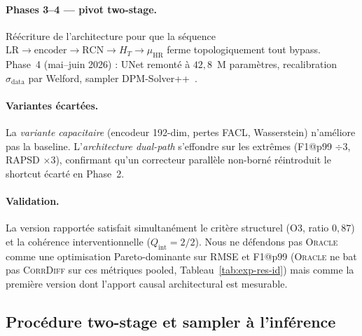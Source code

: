 \documentclass[14pt,a4paper,openany]{extreport}
\newcommand{\Oracle}{\textsc{Oracle}}
\newcommand{\CorrDiff}{\textsc{CorrDiff}}
\newcommand{\HR}{\ensuremath{\text{HR}}}
\newcommand{\LR}{\ensuremath{\text{LR}}}
\newcommand{\muHR}{\ensuremath{\mu_{\HR}}}
\newcommand{\HT}{\ensuremath{H_T}}
\begin{document}
\paragraph{Phases 3--4 --- pivot two-stage.} Réécriture de l'architecture pour que la séquence $\LR \to \mathrm{encoder} \to \mathrm{RCN} \to \HT \to \muHR$ ferme topologiquement tout bypass. Phase~4 (mai--juin 2026) : UNet remonté à $42{,}8$~M paramètres, recalibration $\sigma_{\mathrm{data}}$ par Welford, sampler DPM-Solver++~\cite{lu_dpmpp_2022}.

\paragraph{Variantes écartées.} La \emph{variante capacitaire} (encodeur 192-dim, pertes FACL, Wasserstein) n'améliore pas la baseline. L'\emph{architecture dual-path} s'effondre sur les extrêmes (F1@p99 $\div 3$, RAPSD $\times 3$), confirmant qu'un correcteur parallèle non-borné réintroduit le shortcut écarté en Phase~2.

\paragraph{Validation.} La version rapportée satisfait simultanément le critère structurel (O3, ratio $0{,}87$) et la cohérence interventionnelle ($Q_{\mathrm{int}}=2/2$). Nous ne défendons pas \Oracle{} comme une optimisation Pareto-dominante sur RMSE et F1@p99 (\Oracle{} ne bat pas \CorrDiff{} sur ces métriques pooled, Tableau~\ref{tab:exp-res-id}) mais comme la première version dont l'apport causal architectural est mesurable.

\subsection{Procédure two-stage et sampler à l'inférence}
\label{ssec:exp-traj-procedure}
\end{document}
